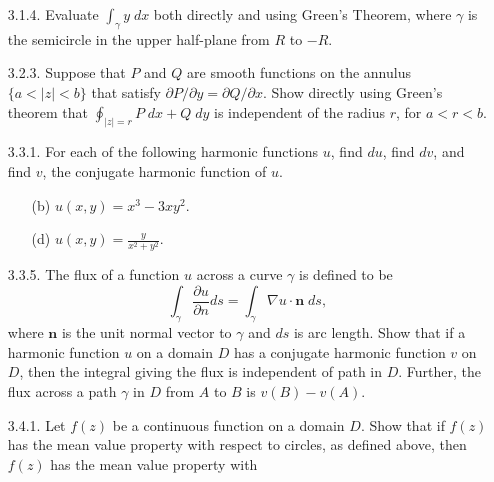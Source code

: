 \documentclass[9pt]{article}
\begin{document}
\begin{enumerate}
   \item[3.1.4.]  Evaluate $\int_\gamma y\;dx$ both directly and using
                  Green's Theorem, where $\gamma$ is the semicircle in the upper
                  half-plane from $R$ to $-R$.
   \item[3.2.3.]  Suppose that $P$ and $Q$ are smooth functions on the annulus
                  $\{a < |z| < b\}$ that satisfy
                  $\partial P/ \partial y =  \partial Q/ \partial x$. Show
                  directly using Green's theorem that
                  $\oint_{|z|=r} P\;dx + Q\;dy$ is independent of the radius
                  $r$, for $a < r < b$.
   \item[3.3.1.]  For each of the following harmonic functions $u$, find $du$,
                  find $dv$, and find $v$, the conjugate harmonic function of
                  $u$.
                  \begin{enumerate}
                     \item[(b)] $u(x, y) = x^3 - 3xy^2$.
                     \item[(d)] $u(x, y) = \frac{y}{x^2+y^2}$.
                  \end{enumerate}
   \item[3.3.5.]  The flux of a function $u$ across a curve $\gamma$ is defined
                  to be
                  $$\int_\gamma\frac{\partial u}{\partial n} ds =
                    \int_\gamma\nabla u \cdot \textbf{n}\;ds,$$
                  where $\textbf{n}$ is the unit normal vector to $\gamma$ and
                  $ds$ is arc length. Show that if a harmonic function $u$ on a
                  domain $D$ has a conjugate harmonic function $v$ on $D$, then
                  the integral giving the flux is independent of path in $D$.
                  Further, the flux across a path $\gamma$ in $D$ from $A$ to
                  $B$ is $v(B) - v(A)$.
   \item[3.4.1.]  Let $f(z)$ be a continuous function on a domain $D$. Show that
                  if $f(z)$ has the mean value property with respect to circles,
                  as defined above, then $f(z)$ has the mean value property with

\end{enumerate}
\end{document}
